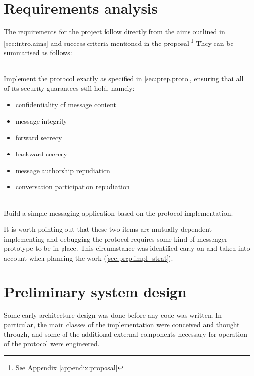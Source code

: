 \documentclass[a4paper, twoside, 12pt]{report}
\begin{document}
\section{Requirements analysis}
\label{sec:prep.requirements}
The requirements for the project follow directly from the aims outlined in \cref{sec:intro.aims} and success criteria mentioned in the proposal.\footnote{See Appendix \ref{appendix:proposal}} They can be summarised as follows:
\begin{description}[labelindent=0.5cm, leftmargin=1.3cm, rightmargin=0.5cm, topsep=3pt]
    \item[Implementing the protocol] \hfill \\
        Implement the protocol exactly as specified in \cref{sec:prep.proto}, ensuring that all of its security guarantees still hold, namely:
        \begin{itemize}[topsep=1pt, itemsep=2pt]
            \item confidentiality of message content
            \item message integrity
            \item forward secrecy
            \item backward secrecy
            \item message authorship repudiation
            \item conversation participation repudiation
        \end{itemize}


    \item[Constructing a useable messaging application] \hfill \\
        Build a simple messaging application based on the protocol implementation.    
\end{description}
\vspace{2pt}
It is worth pointing out that these two items are mutually dependent---implementing and debugging the protocol requires some kind of messenger prototype to be in place. This circumstance was identified early on and taken into account when planning the work (\cref{sec:prep.impl_strat}). \\


\section{Preliminary system design}
\label{sec:prep.design}
Some early architecture design was done before any code was written. In particular, the main classes of the implementation were conceived and thought through, and some of the additional external components necessary for operation of the protocol were engineered.
\end{document}
